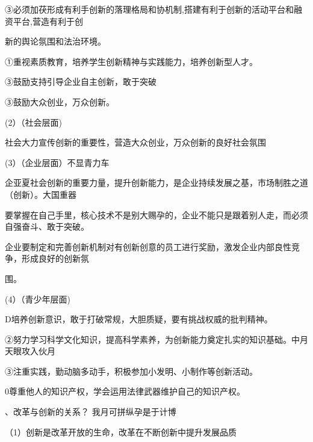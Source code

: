\documentclass[lang=cn,11pt]{elegantbook}
\newcommand{\daofasym}[1]{{\daofasymbolfont #1}}
\newcommand{\daofasym}[1]{#1}
\begin{document}
\daofasym{③}必须加茯形成有利手创新的落理格局和协机制,搭建有利于创新的活动平台和融资平台,营造有利于创\par

新的舆论氛围和法治环境。\par

\daofasym{①}重视素质教育，培养学生创新精神与实践能力，培养创新型人才。\par

\daofasym{③}鼓励支持引导企业自主创新，敢于突破\par

\daofasym{③}鼓励大众创业，万众创新。\par

(2）（社会层面)\par

社会大力宣传创新的重要性，营造大众创业，万众创新的良好社会氛围\par

(3）（企业层面）不显青力车\par

企亚夏社会创新的重要力量，提升创新能力，是企业持续发展之基，市场制胜之道（创新）。大国重器\par

要掌握在自己手里，核心技术不是别大赐孕的，企业不能只是跟着别人走，而必须自强奋斗、敢于突破。\par

企业要制定和完善创新机制对有创新创意的员工进行奖励，激发企业内部良性竞争，形成良好的创新氛\par

围。\par

(4）（青少年层面)\par

D培养创新意识，敢于打破常规，大胆质疑，要有挑战权威的批判精神。\par

\daofasym{②}努力学习科学文化知识，提高科学素养，为创新能力奠定扎实的知识基础。中月天眼攻入伙月\par

\daofasym{③}注重实践，勤动脑多动手，积极参加小发明、小制作等创新活动。\par

0尊重他人的知识产权，学会运用法律武器维护自己的知识产权。\par

、改革与创新的关系？ 我月可拼纵孕是于计博\par

（1）创新是改革开放的生命，改革在不断创新中提升发展品质\par
\end{document}
